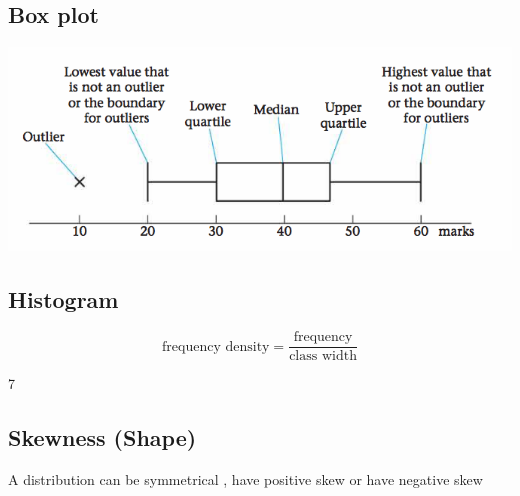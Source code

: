 \documentclass[a4paper]{article}
\begin{document}
\subsection{Box plot}
\begin{center}
	\includegraphics[scale=0.5]{img_S/4_intro}
\end{center}

\subsection{Histogram}

\begin{defi}
	\[
		\text{frequency density}=\frac{\text{frequency}}{\text{class width}}
	\]
\end{defi}
\begin{eg}
	7
\end{eg}

\subsection{Skewness (Shape)}
A distribution can be symmetrical , have positive skew or have negative skew\\
\end{document}
